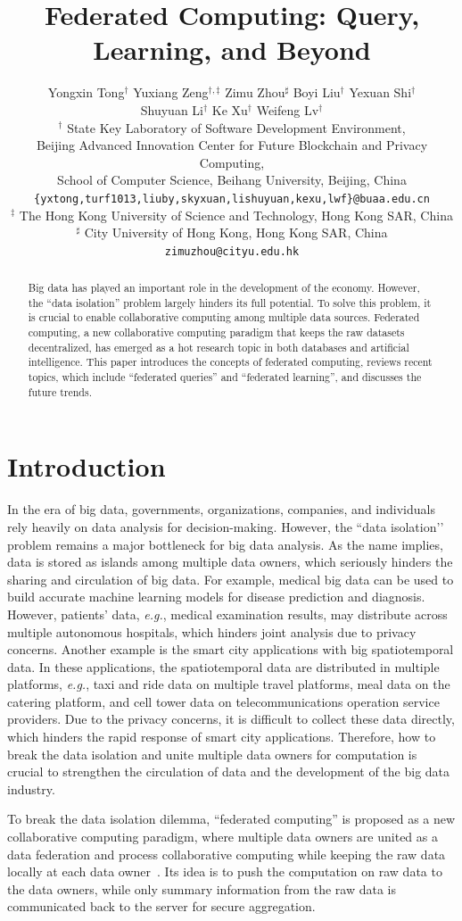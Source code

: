 \documentclass[11pt]{article}
\title{Federated Computing: Query, Learning, and Beyond}
\author{Yongxin Tong$^{\dagger}$
\hspace{1em} Yuxiang Zeng$^{\dagger,\ddagger}$ 
\hspace{1em} Zimu Zhou$^{\sharp}$
\hspace{1em} Boyi Liu$^{\dagger}$
\hspace{1em} Yexuan Shi$^{\dagger}$\\
\hspace{1em} Shuyuan Li$^{\dagger}$
\hspace{1em} Ke Xu$^{\dagger}$
\hspace{1em} Weifeng Lv$^{\dagger}$
\\
$^{\dagger}$ State Key Laboratory of Software Development Environment,\\ 
Beijing Advanced
Innovation Center for Future Blockchain and Privacy Computing, \\
School of Computer Science, Beihang University, Beijing, China \\
\texttt{\small\{yxtong,turf1013,liuby,skyxuan,lishuyuan,kexu,lwf\}@buaa.edu.cn} \\
$^{\ddagger}$ The Hong Kong University of Science and Technology, Hong Kong SAR, China \\
$^{\sharp}$ City University of Hong Kong, Hong Kong SAR, China \hspace{1em} \texttt{\small zimuzhou@cityu.edu.hk} 
}
\newcommand{\eg}{\textit{e.g.},\xspace}
\begin{document}
\maketitle

\begin{abstract}\label{sec:abstract}
Big data has played an important role in the development of the economy.
However, the ``data isolation'' problem largely hinders its full potential. 
To solve this problem, it is crucial to enable collaborative computing among multiple data sources.
Federated computing, a new collaborative computing paradigm that keeps the raw datasets decentralized, has emerged as a hot research topic in both databases and artificial intelligence. 
This paper introduces the concepts of federated computing, reviews recent topics, which include ``federated queries'' and ``federated learning'', and discusses the future trends.

\end{abstract}

\section{Introduction}\label{sec:introduction}
In the era of big data, governments, organizations, companies, and individuals rely heavily on data analysis for decision-making. 
However, the ``data isolation’’ problem remains a major bottleneck for big data analysis. 
As the name implies, data is stored as islands among multiple data owners, which seriously hinders the sharing and circulation of big data. 
For example, medical big data can be used to build accurate machine learning models for disease prediction and diagnosis. 
However, patients' data, \eg medical examination results, may distribute across multiple autonomous hospitals, which hinders joint analysis due to privacy concerns.
Another example is the smart city applications with big spatiotemporal data.
In these applications, the spatiotemporal data are distributed in multiple platforms, \eg taxi and ride data on multiple travel platforms, meal data on the catering platform, and cell tower data on telecommunications operation service providers. Due to the privacy concerns, it is difficult to collect these data directly, which hinders the rapid response of smart city applications. 
Therefore, how to break the data isolation and unite multiple data owners for computation is crucial to strengthen the circulation of data and the development of the big data industry.

To break the data isolation dilemma, ``federated computing'' is proposed as a new collaborative computing paradigm, where multiple data owners are united as a data federation and process collaborative computing while keeping the raw data locally at each data owner~\cite{DBLP:journals/tist/YangLCT19,ref_bater2017smcql,DBLP:conf/sigmod/BharadwajC22}. 
Its idea is to push the computation on raw data to the data owners, while only summary information from the raw data is communicated back to the server for secure aggregation.
\end{document}
